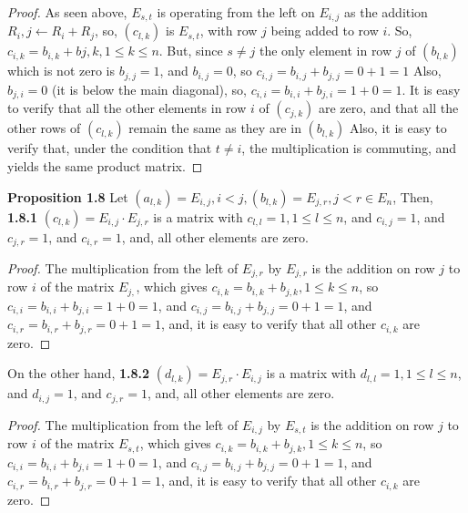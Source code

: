 \documentclass[12pt]{article}
\begin{document}
\begin{proof}
As seen above, $E_{s,t}$ is operating from the left on $E_{i,j}$ as the addition $R_i,j \leftarrow R_i+R_j$, so, $(c_{l,k})$ is $E_{s,t}$, with row $j$ being added to row $i$. \newline
So, $c_{i,k}=b_{i,k}+b{j,k},1 \leq k \leq n$. But, since $s \neq j$ the only element in row $j$ of $(b_{l,k})$ which is not zero is $b_{j,j}=1$, and $b_{i,j}=0$, so $c_{i,j}=b_{i,j}+b_{j,j}=0+1=1$ \newline
Also, $b_{j,i}=0$ (it is below the main diagonal), so, $c_{i,i}=b_{i,i}+b_{j,i}=1+0=1$. \newline
It is easy to verify that all the other elements in row $i$ of $(c_{j,k})$ are zero, and that all the other rows of $(c_{l,k})$ remain the same as they are in $(b_{l,k})$ \newline
Also, it is easy to verify that, under the condition that $t \neq i$, the multiplication is commuting, and yields the same product matrix. 
\end{proof}
\textbf{Proposition 1.8} \newline
Let $(a_{l,k})=E_{i,j},i<j,(b_{l,k})=E_{j,r},j<r \in E_n$, Then, \newline
\textbf{1.8.1} $(c_{l,k})=E_{i,j} \cdot E_{j,r}$ is a matrix with $c_{l,l}=1,1 \leq l \leq n$, and $c_{i,j}=1$, and $c_{j,r}=1$, and $c_{i,r}=1$, and, all other elements are zero.
\begin{proof}
The multiplication from the left of $E_{j,r}$ by $E_{j,r}$ is the addition on row $j$ to row $i$ of the matrix $E_{j,}$, which gives $c_{i,k}=b_{i,k}+b_{j,k},1 \leq k \leq n$, so $c_{i,i}=b_{i,i}+b_{j,i}=1+0=1$, and $c_{i,j}=b_{i,j}+b_{j,j}=0+1=1$, and $c_{i,r}=b_{i,r}+b_{j,r}=0+1=1$, and, it is easy to verify that all other $c_{i,k}$ are zero. \newline
\end{proof}
On the other hand, \newline
\textbf{1.8.2} $(d_{l,k})=E_{j,r} \cdot E_{i,j}$ is a matrix with $d_{l,l}=1,1 \leq l \leq n$, and $d_{i,j}=1$, and $c_{j,r}=1$, and, all other elements are zero.
\begin{proof}
The multiplication from the left of $E_{i,j}$ by $E_{s,t}$ is the addition on row $j$ to row $i$ of the matrix $E_{s,t}$, which gives $c_{i,k}=b_{i,k}+b_{j,k},1 \leq k \leq n$, so $c_{i,i}=b_{i,i}+b_{j,i}=1+0=1$, and $c_{i,j}=b_{i,j}+b_{j,j}=0+1=1$, and $c_{i,r}=b_{i,r}+b_{j,r}=0+1=1$, and, it is easy to verify that all other $c_{i,k}$ are zero. 
\end{proof}
\end{document}
